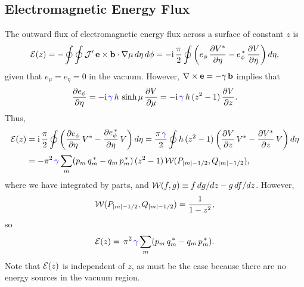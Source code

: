 \documentclass[12pt,prb,aps]{revtex4-1}
\begin{document}
\subsection{Electromagnetic Energy Flux}
The outward flux of electromagnetic energy flux across a  surface of constant $z$ is
\begin{align}
{\cal E}(z) = -\oint\oint {\cal J}'\,{\bf e}\times {\bf b}\cdot\nabla \mu\,d\eta\,d\phi= -{\rm i}\,
\frac{\pi}{2}\oint\left(e_\phi\,\frac{\partial V^\ast}{\partial\eta}
- e_\phi^{\,\ast}\,\frac{\partial V}{\partial\eta}\right)d\eta,
\end{align}
given that $e_\mu=e_\eta=0$ in the vacuum. 
However, $\nabla\times{\bf e}= -\gamma\,{\bf b}$ implies that
\begin{equation}
\frac{\partial e_\phi}{\partial\eta} = - {\rm i}\,\textcolor{blue}{\gamma}\,h\,\sinh\mu\,\frac{\partial V}{\partial \mu}= - {\rm i}\,\textcolor{blue}{\gamma}\,h\,(z^2-1)\,\frac{\partial V}{\partial z}. 
\end{equation}
Thus,
\begin{align}
{\cal E}(z) &= {\rm i}\,\frac{\pi}{2}\oint\left(\frac{\partial e_\phi}{\partial\eta}\,V^\ast - \frac{\partial e_\phi^{\,\ast}}{\partial\eta}\,V\right)d\eta= 
\frac{\pi\,\textcolor{blue}{\gamma}}{2}\oint h\,(z^2-1)\left(\frac{\partial V}{\partial z}\,V^\ast - \frac{\partial V^\ast}{\partial z}\,V\right) d\eta\nonumber\\[0.5ex]
&= -\pi^2\,\textcolor{blue}{\gamma}\sum_m(p_m\,q_m^{\,\ast}-q_m\,p_m^{\,\ast})\,(z^2-1)\,{\cal W}(P_{|m|-1/2},Q_{|m|-1/2}),
 \end{align}
 where we have integrated by parts, and ${\cal W}(f,g)\equiv f\,dg/dz-g\,df/dz$. However,\cite{mf2}
 \begin{equation}
 {\cal W}(P_{|m|-1/2},Q_{|m|-1/2}) = \frac{1}{1-z^2},
 \end{equation}
 so
 \begin{equation}\label{e168g}
 {\cal E}(z)=\,\pi^2\,\textcolor{blue}{\gamma}\sum_m(p_m\,q_m^{\,\ast}-q_m\,p_m^{\,\ast}).
 \end{equation}
 Note that ${\cal E}(z)$ is independent of $z$, as must be the case because there are no energy sources in the vacuum region. 
\end{document}
